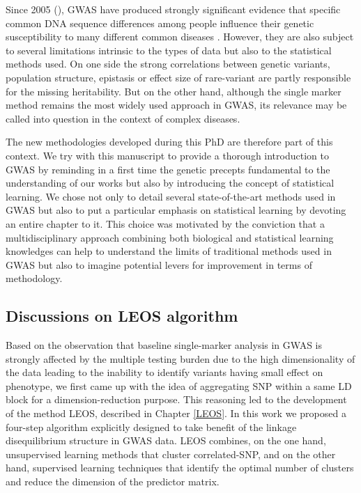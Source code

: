 \documentclass[]{book}
\begin{document}
Since 2005 (\citep{klein2005complement}), GWAS have produced strongly
significant evidence that specific common DNA sequence differences among
people influence their genetic susceptibility to many different common
diseases \citep{manolio2008hapmap}. However, they are also subject to several
limitations intrinsic to the types of data but also to the statistical
methods used. On one side the strong correlations between genetic
variants, population structure, epistasis or effect size of rare-variant
are partly responsible for the missing heritability. But on the other
hand, although the single marker method remains the most widely used
approach in GWAS, its relevance may be called into question in the
context of complex diseases.

The new methodologies developed during this PhD are therefore part of
this context. We try with this manuscript to provide a thorough
introduction to GWAS by reminding in a first time the genetic precepts
fundamental to the understanding of our works but also by introducing
the concept of statistical learning. We chose not only to detail several
state-of-the-art methods used in GWAS but also to put a particular
emphasis on statistical learning by devoting an entire chapter to it.
This choice was motivated by the conviction that a multidisciplinary
approach combining both biological and statistical learning knowledges
can help to understand the limits of traditional methods used in GWAS
but also to imagine potential levers for improvement in terms of
methodology.

\hypertarget{discussions-on-leos-algorithm}{%
\subsection*{Discussions on LEOS algorithm}\label{discussions-on-leos-algorithm}}

Based on the observation that baseline single-marker analysis in GWAS is
strongly affected by the multiple testing burden due to the high
dimensionality of the data leading to the inability to identify variants
having small effect on phenotype, we first came up with the idea of
aggregating SNP within a same LD block for a dimension-reduction
purpose. This reasoning led to the development of the method LEOS,
described in Chapter \ref{LEOS}. In this work we proposed a four-step
algorithm explicitly designed to take benefit of the linkage
disequilibrium structure in GWAS data. LEOS combines, on the one hand,
unsupervised learning methods that cluster correlated-SNP, and on the
other hand, supervised learning techniques that identify the optimal
number of clusters and reduce the dimension of the predictor matrix.
\end{document}
